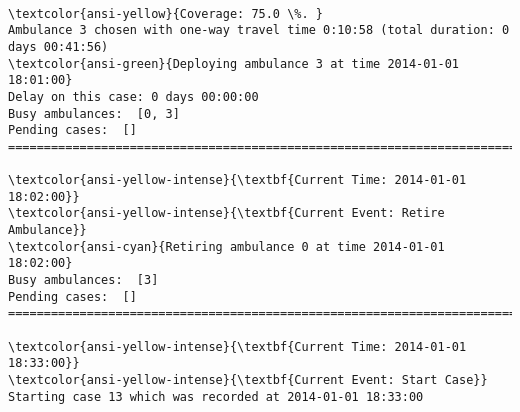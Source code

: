 \documentclass[11pt]{article}
\begin{document}
    \begin{center}
    \end{center}
    { \hspace*{\fill} \\}
    
    \begin{Verbatim}[commandchars=\\\{\}]
\textcolor{ansi-yellow}{Coverage: 75.0 \%. }
Ambulance 3 chosen with one-way travel time 0:10:58 (total duration: 0 days 00:41:56)
\textcolor{ansi-green}{Deploying ambulance 3 at time 2014-01-01 18:01:00}
Delay on this case: 0 days 00:00:00
Busy ambulances:  [0, 3]
Pending cases:  []
========================================================================

\textcolor{ansi-yellow-intense}{\textbf{Current Time: 2014-01-01 18:02:00}}
\textcolor{ansi-yellow-intense}{\textbf{Current Event: Retire Ambulance}}
\textcolor{ansi-cyan}{Retiring ambulance 0 at time 2014-01-01 18:02:00}
Busy ambulances:  [3]
Pending cases:  []
========================================================================

\textcolor{ansi-yellow-intense}{\textbf{Current Time: 2014-01-01 18:33:00}}
\textcolor{ansi-yellow-intense}{\textbf{Current Event: Start Case}}
Starting case 13 which was recorded at 2014-01-01 18:33:00

    \end{Verbatim}

    \begin{center}
    \end{center}
    { \hspace*{\fill} \\}
    
\end{document}
